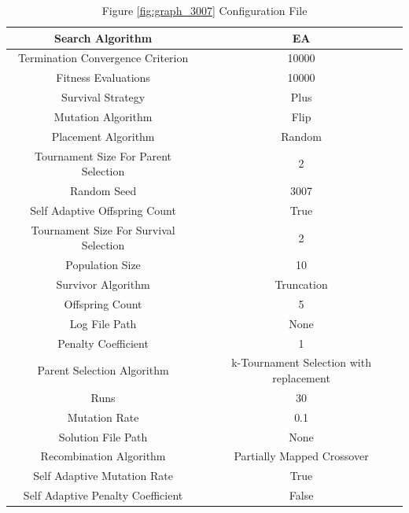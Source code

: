 \documentclass{standalone}
\begin{document}
\begin{table}[!htb]
	\centering
	\caption{Figure \ref{fig:graph_3007} Configuration File}
	\label{tab:graph_3007}
	\begin{tabular}{| c | c |}
		\hline
		Search Algorithm		& EA		 \\
		\hline
		Termination Convergence Criterion		& 10000		 \\
		\hline
		Fitness Evaluations		& 10000		 \\
		\hline
		Survival Strategy		& Plus		 \\
		\hline
		Mutation Algorithm		& Flip		 \\
		\hline
		Placement Algorithm		& Random		 \\
		\hline
		Tournament Size For Parent Selection		& 2		 \\
		\hline
		Random Seed		& 3007		 \\
		\hline
		Self Adaptive Offspring Count		& True		 \\
		\hline
		Tournament Size For Survival Selection		& 2		 \\
		\hline
		Population Size		& 10		 \\
		\hline
		Survivor Algorithm		& Truncation		 \\
		\hline
		Offspring Count		& 5		 \\
		\hline
		Log File Path		& None		 \\
		\hline
		Penalty Coefficient		& 1		 \\
		\hline
		Parent Selection Algorithm		& k-Tournament Selection with replacement		 \\
		\hline
		Runs		& 30		 \\
		\hline
		Mutation Rate		& 0.1		 \\
		\hline
		Solution File Path		& None		 \\
		\hline
		Recombination Algorithm		& Partially Mapped Crossover		 \\
		\hline
		Self Adaptive Mutation Rate		& True		 \\
		\hline
		Self Adaptive Penalty Coefficient		& False		 \\
		\hline
	\end{tabular}
\end{table}
\end{document}
